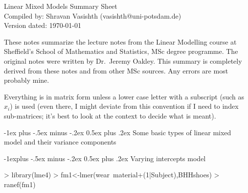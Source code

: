 \documentclass[10pt,landscape]{article}
\makeatletter
\renewcommand{\section}{\@startsection{section}{1}{0mm}%
                                {-1ex plus -.5ex minus -.2ex}%
                                {0.5ex plus .2ex}%
                                {\normalfont\large\bfseries}}
\renewcommand{\subsection}{\@startsection{subsection}{2}{0mm}%
                                {-1explus -.5ex minus -.2ex}%
                                {0.5ex plus .2ex}%
                                {\normalfont\normalsize\bfseries}}
\makeatother
\begin{document}




\raggedright
\footnotesize
\begin{multicols}{3}


\setlength{\premulticols}{1pt}
\setlength{\postmulticols}{1pt}
\setlength{\multicolsep}{1pt}
\setlength{\columnsep}{2pt}

\begin{center}
     \normalsize{Linear Mixed Models Summary Sheet} \\
    \footnotesize{
    Compiled by: Shravan Vasishth (vasishth@uni-potsdam.de)\\
    Version dated: \today}
\end{center}





These notes summarize the lecture notes from the Linear Modelling course at Sheffield's School of Mathematics and Statistics, MSc degree programme. The original notes were written by Dr.\ Jeremy Oakley. This summary is completely derived from these notes and from other MSc sources. Any errors are most probably mine.

Everything is in matrix form unless a lower case letter with a subscript (such as $x_i$) is used (even there, I might deviate from this convention if I need to index sub-matrices; it's best to look at the context to decide what is meant).

\section{Some basic types of linear mixed model and their variance components}

\subsection{Varying intercepts model}

\begin{Schunk}
\begin{Sinput}
> library(lme4)
> fm1<-lmer(wear~material+(1|Subject),BHHshoes)
> ranef(fm1)
\end{Sinput}
\end{Schunk}


\end{multicols}
\end{document}

